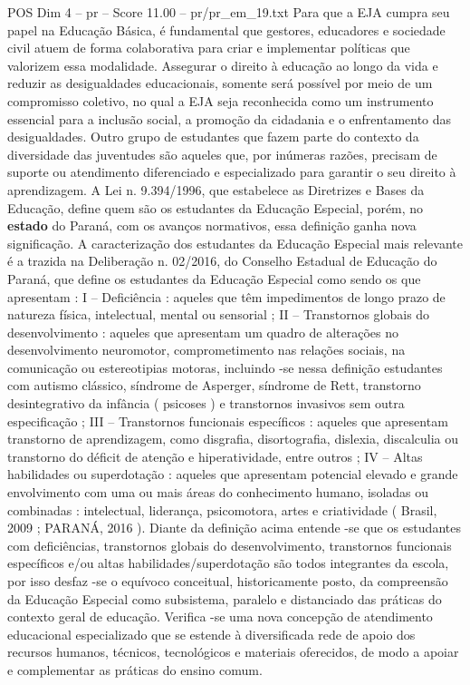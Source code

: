 \begin{textsample}{POS Dim 4 – pr – Score 11.00 – pr/pr\_em\_19.txt}
Para que a EJA cumpra seu papel na Educação Básica, é fundamental que gestores, educadores e sociedade civil atuem de forma colaborativa para criar e implementar políticas que valorizem essa modalidade.
Assegurar o direito à educação ao longo da vida e reduzir as desigualdades educacionais, somente será possível por meio de um compromisso coletivo, no qual a EJA seja reconhecida como um instrumento essencial para a inclusão social, a promoção da cidadania e o enfrentamento das desigualdades.
Outro grupo de estudantes que fazem parte do contexto da diversidade das juventudes são aqueles que, por inúmeras razões, precisam de suporte ou atendimento diferenciado e especializado para garantir o seu direito à aprendizagem.
A Lei n. 9.394/1996, que estabelece as Diretrizes e Bases da Educação, define quem são os estudantes da Educação Especial, porém, no \textbf{estado} do Paraná, com os avanços normativos, essa definição ganha nova significação.
A caracterização dos estudantes da Educação Especial mais relevante é a trazida na Deliberação n. 02/2016, do Conselho Estadual de Educação do Paraná, que define os estudantes da Educação Especial como sendo os que apresentam : I – Deficiência : aqueles que têm impedimentos de longo prazo de natureza física, intelectual, mental ou sensorial ; II – Transtornos globais do desenvolvimento : aqueles que apresentam um quadro de alterações no desenvolvimento neuromotor, comprometimento nas relações sociais, na comunicação ou estereotipias motoras, incluindo -se nessa definição estudantes com autismo clássico, síndrome de Asperger, síndrome de Rett, transtorno desintegrativo da infância ( psicoses ) e transtornos invasivos sem outra especificação ; III – Transtornos funcionais específicos : aqueles que apresentam transtorno de aprendizagem, como disgrafia, disortografia, dislexia, discalculia ou transtorno do déficit de atenção e hiperatividade, entre outros ; IV – Altas habilidades ou superdotação : aqueles que apresentam potencial elevado e grande envolvimento com uma ou mais áreas do conhecimento humano, isoladas ou combinadas : intelectual, liderança, psicomotora, artes e criatividade ( Brasil, 2009 ; PARANÁ, 2016 ).
Diante da definição acima entende -se que os estudantes com deficiências, transtornos globais do desenvolvimento, transtornos funcionais específicos e/ou altas habilidades/superdotação são todos integrantes da escola, por isso desfaz -se o equívoco conceitual, historicamente posto, da compreensão da Educação Especial como subsistema, paralelo e distanciado das práticas do contexto geral de educação.
Verifica -se uma nova concepção de atendimento educacional especializado que se estende à diversificada rede de apoio dos recursos humanos, técnicos, tecnológicos e materiais oferecidos, de modo a apoiar e complementar as práticas do ensino comum.

\end{textsample}

